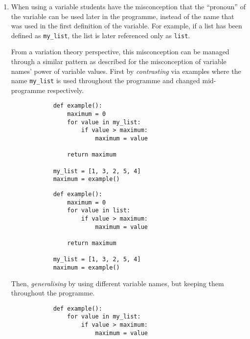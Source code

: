 \begin{enumerate}
    \item When using a variable students have the misconception that the 
      \enquote{pronoun} of the variable can be used later in the programme, 
      instead of the name that was used in the first definition of the 
      variable. For example, if a list has been defined as 
      \texttt{my_list}, the list is later referenced only as 
      \texttt{list}.

      From a variation theory perspective, this misconception can be 
managed through a similar pattern as described for the misconception 
of variable names' power of variable values. First by \emph{
contrasting} via examples where the name \texttt{my_list}
 is used throughout the programme and changed mid-programme 
respectively. 
      
    \hfill
     \begin{minipage}[t]{0.45\columnwidth}
        \begin{verbatim}
            def example():
                maximum = 0
                for value in my_list:
                    if value > maximum:
                        maximum = value
    
                return maximum
                
            my_list = [1, 3, 2, 5, 4]
            maximum = example()
        \end{verbatim}
    \end{minipage}
\hfill
    \begin{minipage}[t]{0.45\columnwidth}
        \begin{verbatim}
            def example():
                maximum = 0
                for value in list:
                    if value > maximum:
                        maximum = value
    
                return maximum

            my_list = [1, 3, 2, 5, 4]
            maximum = example()
        \end{verbatim}
    \end{minipage}
\hfill
     
      Then, \emph{generalising} by using different variable names, but 
keeping them throughout the programme. 
        \hfill
        \begin{verbatim}
            def example():
                for value in my_list:
                    if value > maximum:
                        maximum = value
    

\end{verbatim}
\end{enumerate}

